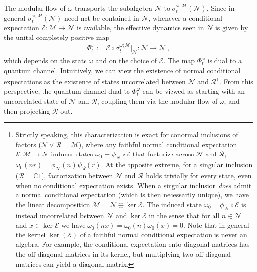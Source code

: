 \documentclass[a4paper,11pt]{article}
\theoremstyle{definition}
\newcommand{\mR}{\mathcal{R}}
\newcommand{\mN}{\mathcal{N}}
\newcommand{\mM}{\mathcal{M}}
\newcommand{\mE}{\mathcal{E}}
\begin{document}
The modular flow of $\omega$ transports the subalgebra $\mN$ to
$\sigma^{\omega;\mM}_t(\mN)$. Since in general
$\sigma^{\omega;\mM}_t(\mN)$ need not be contained in $\mN$, whenever a conditional expectation $\mE:\mM\to\mN$ is available, the effective dynamics seen in $\mN$ is given by the unital completely positive map
\begin{align}
    \Phi^{\omega}_t:=\mE\circ\sigma^{\omega;\mM}_t\big|_{\mN}:\mN\to\mN\ ,
    \label{eq:reduced-dynamics}
\end{align}
which depends on the state $\omega$ and on the choice of $\mE$. The map $\Phi^{\omega}_t$ is dual to a quantum channel. Intuitively, we can view the existence of normal conditional expectations as the existence of states uncorrelated between $\mN$ and $\mR$\footnote{Strictly speaking, this characterization is exact for conormal inclusions of factors ($\mN \vee \mR = \mM$), where any faithful normal conditional expectation $\mE: \mM \to \mN$ induces states $\omega_0 = \phi_{\mN} \circ \mE$ that factorize across $\mN$ and $\mR$, $\omega_0(nr) = \phi_{\mN}(n)\psi_{\mR}(r)$. At the opposite extreme, for a singular inclusion ($\mR = \mathbb{C}1$), factorization between $\mN$ and $\mR$ holds trivially for every state, even when no conditional expectation exists. When a singular inclusion \emph{does} admit a normal conditional expectation (which is then necessarily unique), we have the linear decomposition $\mM=\mN\oplus \ker{\mE}$.  The induced state $\omega_0 = \phi_{\mN} \circ \mE$ is instead uncorrelated between $\mN$ and $\ker\mE$ in the sense that for all $n\in\mN$ and $x\in \ker\mE$ we have $\omega_0(n x)=\omega_0(n) \omega_0(x)=0$. Note that in general the kernel $\ker(\mE)$ of a faithful normal conditional expectation is never an algebra. For example, the conditional expectation onto diagonal matrices has the off-diagonal matrices in its kernel, but multiplying two off-diagonal matrices can yield a diagonal matrix.}. From this perspective, the quantum channel dual to $\Phi^{\omega}_t$ can be viewed as starting with an uncorrelated state of $\mN$ and $\mR$, coupling them via the modular flow of $\omega$, and then projecting $\mR$ out.
\end{document}

